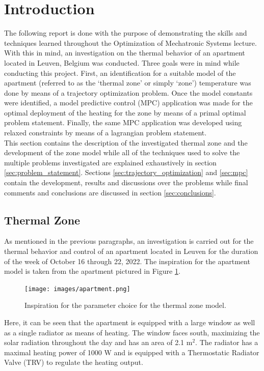\section{Introduction}
\label{sec:intro}
The following report is done with the purpose of demonstrating the skills and techniques learned throughout the Optimization of Mechatronic Systems lecture. With this in mind, an investigation on the thermal behavior of an apartment located in Leuven, Belgium was conducted. Three goals were in mind while conducting this project. First, an identification for a suitable model of the apartment (referred to as the `thermal zone' or simply `zone') temperature was done by means of a trajectory optimization problem. Once the model constants were identified, a model predictive control (MPC) application was made for the optimal deployment of the heating for the zone by means of a primal optimal problem statement. Finally, the same MPC application was developed using relaxed constraints by means of a lagrangian problem statement. \\

This section contains the description of the investigated thermal zone and the development of the zone model while all of the techniques used to solve the multiple problems investigated are explained exhaustively in section \ref{sec:problem_statement}. Sections \ref{sec:trajectory_optimization} and \ref{sec:mpc} contain the development, results and discussions over the problems while final comments and conclusions are discussed in section \ref{sec:conclusions}.

\subsection{Thermal Zone}
\label{subsec:thermal_zone}
As mentioned in the previous paragraphs, an investigation is carried out for the thermal behavior and control of an apartment located in Leuven for the duration of the week of October 16 through 22, 2022. The inspiration for the apartment model is taken from the apartment pictured in Figure \ref{fig:apartment}.

\begin{figure}[H]
\centering
\texttt{[image: images/apartment.png]}
\caption{Inspiration for the parameter choice for the thermal zone model.}
\label{fig:apartment}
\end{figure}

Here, it can be seen that the apartment is equipped with a large window as well as a single radiator as means of heating. The window faces south, maximizing the solar radiation throughout the day and has an area of 2.1 m$^2$. The radiator has a maximal heating power of 1000 W and is equipped with a Thermostatic Radiator Valve (TRV) to regulate the heating output.

